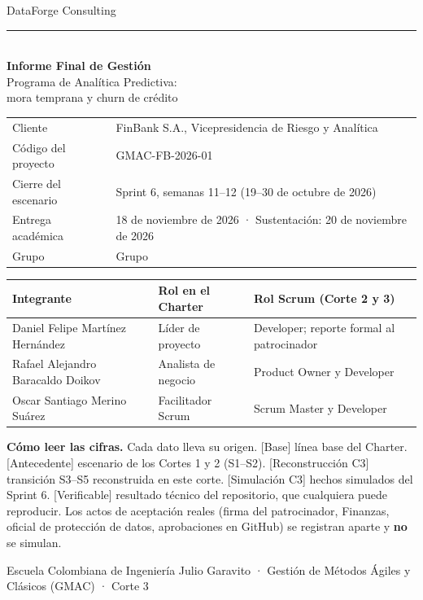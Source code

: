 \documentclass[10pt,a4paper]{article}
\newcommand{\rot}[1]{\textsf{\scriptsize\color{gris}[#1]}}
\begin{document}
\begin{titlepage}
\color{navy}
\vspace*{1.2cm}
{\large DataForge Consulting}\\[0.3em]
{\color{gris}\rule{\linewidth}{0.6pt}}\\[1.5cm]
{\fontsize{30}{36}\selectfont\bfseries Informe Final de Gestión}\\[0.6cm]
{\Large Programa de Analítica Predictiva:\\ mora temprana y churn de crédito}\\[1.2cm]
\color{black}
\begin{tabular}{@{}ll}
Cliente & FinBank S.A., Vicepresidencia de Riesgo y Analítica \\
Código del proyecto & GMAC-FB-2026-01 \\
Cierre del escenario & Sprint 6, semanas 11--12 (19--30 de octubre de 2026) \\
Entrega académica & 18 de noviembre de 2026 · Sustentación: 20 de noviembre de 2026 \\
Grupo & Grupo \Grupo{} \\
\end{tabular}

\vspace{1.2cm}
\begin{tabular}{@{}lll}
\textbf{Integrante} & \textbf{Rol en el Charter} & \textbf{Rol Scrum (Corte 2 y 3)} \\
\midrule
Daniel Felipe Martínez Hernández & Líder de proyecto & Developer; reporte formal al patrocinador \\
Rafael Alejandro Baracaldo Doikov & Analista de negocio & Product Owner y Developer \\
Oscar Santiago Merino Suárez & Facilitador Scrum & Scrum Master y Developer \\
\end{tabular}

\vfill
\begin{tcolorbox}[colback=navy!4,colframe=navy!40,boxrule=0.4pt,arc=1mm,left=2mm,right=2mm]
\small\textbf{Cómo leer las cifras.} Cada dato lleva su origen.
\rot{Base} línea base del Charter.
\rot{Antecedente} escenario de los Cortes 1 y 2 (S1--S2).
\rot{Reconstrucción C3} transición S3--S5 reconstruida en este corte.
\rot{Simulación C3} hechos simulados del Sprint 6.
\rot{Verificable} resultado técnico del repositorio, que cualquiera puede reproducir.
Los actos de aceptación reales (firma del patrocinador, Finanzas, oficial de protección de datos, aprobaciones en GitHub) se registran aparte y \textbf{no} se simulan.
\end{tcolorbox}
\vspace{0.4cm}
{\small Escuela Colombiana de Ingeniería Julio Garavito · Gestión de Métodos Ágiles y Clásicos (GMAC) · Corte 3}
\end{titlepage}
\end{document}

